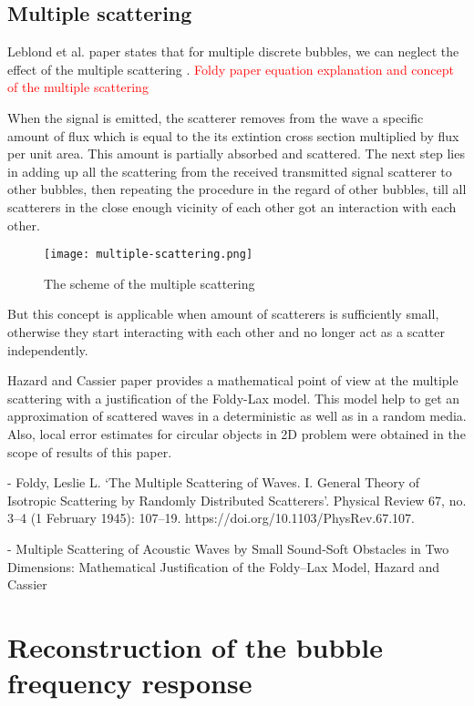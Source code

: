 \subsection{Multiple scattering }

Leblond et al. paper states that for multiple discrete bubbles, we can neglect the effect of the multiple scattering \cite[]{leblond_acoustic_2014}. 
\textcolor{red}{Foldy paper equation explanation and concept of the multiple scattering}

When the signal is emitted, the scatterer removes from the wave a specific amount of flux which is equal to the its extintion cross section multiplied by flux per unit area. This amount is partially absorbed and scattered. The next step lies in adding up all the scattering from the received transmitted signal scatterer to other bubbles, then repeating the procedure in the regard of other bubbles, till all scatterers in the close enough vicinity of each other got an interaction with each other.

\begin{figure}[H]
    \centering
    \texttt{[image: multiple-scattering.png]}
    \caption*{The scheme of the multiple scattering}
    \label{fig:multiple-scattering}
\end{figure}

But this concept is applicable when amount of scatterers is sufficiently small, otherwise they start interacting with each other and no longer act as a scatter independently. %

Hazard and Cassier paper provides a mathematical point of view at the multiple scattering with a justification of the Foldy-Lax model. This model help to get an approximation of scattered waves in a deterministic as well as in a random media. Also, local error estimates for circular objects in 2D problem were obtained in the scope of results of this paper.

- Foldy, Leslie L. ‘The Multiple Scattering of Waves. I. General Theory of Isotropic Scattering by Randomly Distributed Scatterers’. Physical Review 67, no. 3–4 (1 February 1945): 107–19. https://doi.org/10.1103/PhysRev.67.107.

- Multiple Scattering of Acoustic Waves by Small Sound-Soft Obstacles in Two Dimensions: Mathematical Justification of the Foldy–Lax Model, Hazard and Cassier


\section{Reconstruction of the bubble frequency response}

